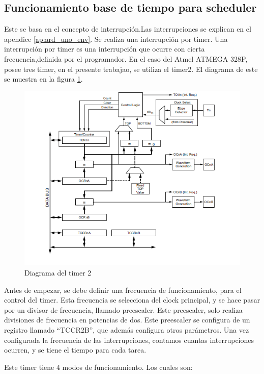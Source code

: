 \subsection{Funcionamiento base de tiempo para scheduler}

Este se basa en el concepto de interrupción.Las interrupciones se explican en el apendice \ref{ap:ard_uno_env}. Se realiza una interrupción por timer. Una interrupción por timer es una interrupción que ocurre con cierta frecuencia,definida por el programador. En el caso del Atmel ATMEGA 328P, posee tres timer, en el presente trabajao, se utiliza el timer2. El diagrama de este se muestra en la figura \ref{fig:timer_2}. 

\begin{figure}[ht]
	\includegraphics{timer_2}
	\caption{Diagrama del timer 2 }
	\label{fig:timer_2}
\end{figure}


Antes de empezar, se debe definir una frecuencia de funcionamiento, para el control del timer. Esta frecuencia se selecciona del clock principal, y se hace pasar por un divisor de frecuencia, llamado preescaler. Este preescaler, solo realiza divisiones de frecuencia en potencias de dos. Este preescaler se configura de un registro llamado “TCCR2B”, que además configura otros parámetros. Una vez configurada la frecuencia de las interrupciones, contamos cuantas interrupciones ocurren, y se tiene el tiempo para cada tarea. 

Este timer tiene 4 modos de funcionamiento. Los cuales son:  

